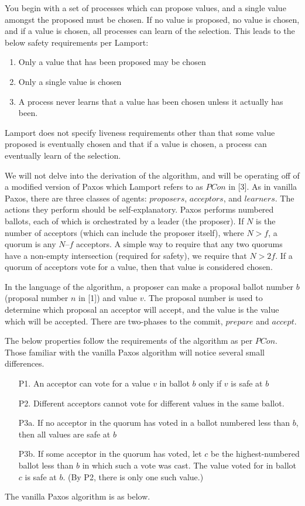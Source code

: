 \documentclass[conference]{IEEEtran}
\begin{document}
You begin with a set of processes which can propose values, and a single value amongst the proposed must be chosen. If no value is proposed, no value is chosen, and if a value is chosen, all processes can learn of the selection. This leads to the below safety requirements per Lamport:
\smallskip
\begin{enumerate}
\item Only a value that has been proposed may be chosen
\item Only a single value is chosen
\item A process never learns that a value has been chosen unless it actually has been.
\end{enumerate}
\smallskip

Lamport does not specify liveness requirements other than that some value proposed is eventually chosen and that if a value is chosen, a process can eventually learn of the selection.

We will not delve into the derivation of the algorithm, and will be operating off of a modified version of Paxos which Lamport refers to as $PCon$ in [3]. As in vanilla Paxos, there are three classes of agents: $proposers$, $acceptors$, and $learners$. The actions they perform should be self-explanatory. Paxos performs numbered ballots, each of which is orchestrated by a leader (the proposer). If $N$ is the number of acceptors (which can include the proposer itself), where $N > f$, a quorum is any $N – f$ acceptors. A simple way to require that any two quorums have a non-empty intersection (required for safety), we require that $N > 2f$. If a quorum of acceptors vote for a value, then that value is considered chosen.

In the language of the algorithm, a proposer can make a proposal ballot number $b$ (proposal number $n$ in [1]) and value $v$. The proposal number is used to determine which proposal an acceptor will accept, and the value is the value which will be accepted. There are two-phases to the commit, $prepare$ and $accept$.

The below properties follow the requirements of the algorithm as per $PCon$. Those familiar with the vanilla Paxos algorithm will notice several small differences.
\smallskip
\begin{enumerate}[leftmargin=4em]
\item[P1.] An acceptor can vote for a value $v$ in ballot $b$ only if $v$ is safe at $b$
\item[P2.] Different acceptors cannot vote for different values in the same ballot.
\item[P3a.] If no acceptor in the quorum has voted in a ballot numbered less than $b$, then all values are safe at $b$
\item[P3b.] If some acceptor in the quorum has voted, let $c$ be the highest-numbered ballot less than $b$ in which such a vote was cast. The value voted for in ballot $c$ is safe at $b$. (By P2, there is only one such value.)
\end{enumerate}
\smallskip
The vanilla Paxos algorithm is as below.
\smallskip
\end{document}
